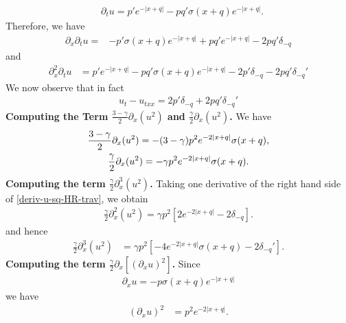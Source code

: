 \documentclass[12pt,reqno]{amsart}
\numberwithin{equation}{section}  %
\numberwithin{figure}{section}
\newcommand{\p}{\partial}
\theoremstyle{plain}  %
\theoremstyle{definition}
\begin{document}
%
\begin{align*}
  &\p_t u
  =
  p'e^{-|x+q|} 
  -
  pq'\sigma(x+q)e^{-|x+q|}.
\end{align*}
%
Therefore, we have 
%
\begin{align*}
  \p_x\p_t u
  = 
  &-p' \sigma(x+q) e^{-|x+q|}
  + 
  pq'e^{-|x+q|} 
  -
  2pq' \delta_{-q}
\end{align*}
%
and 
%
\begin{align*}
  \p_x^2\p_t u
  &=
  p'e^{-|x+q|}
  -
  pq'\sigma(x+q)e^{-|x+q|}
  -2p' \delta_{-q} - 2pq'\delta_{-q}' 
\end{align*}
%
We now observe that in fact
%
\begin{align}
  \label{deriv-t-term-trav-wav}
  u_t - u_{txx} = 2p' \delta_{-q} + 2pq'\delta_{-q}' 
\end{align}
%
{\bf Computing the Term $\displaystyle \frac{3-\gamma}{2} \p_x (u^{2})$ and $\displaystyle \frac{\gamma}{2} \p_x (u^{2})$.}
We have
%
%
%
%
\begin{gather}
  \notag \frac{3-\gamma}{2}\p_x (u^{2}) 
  = -(3-\gamma) p^{2}e^{-2| x+q |} \sigma(x+q),
  \\
  \label{deriv-u-sq-HR-trav}
  \frac{\gamma}{2}\p_x (u^{2}) 
  = -\gamma p^{2}e^{-2| x+q |} \sigma(x+q). 
\end{gather}
%
{\bf Computing the term $\displaystyle \frac{\gamma}{2} \p_x^3 (u^2)$.}
Taking one derivative of the right hand side of \eqref{deriv-u-sq-HR-trav}, we obtain 
%
\begin{equation*}
  \begin{split}
    \frac{\gamma}{2}\p_x^2 (u^{2})
    = \gamma p^{2}\left[ 2 e^{-2| x+q |} -2 \delta_{-q}  
    \right].
  \end{split}
\end{equation*}
%
and hence
\begin{equation}
  \label{deriv-trip-u-sq-HR-trav}
  \begin{split}
    \frac{\gamma}{2}\p_x^3 (u^{2})
    & = \gamma p^{2}\left[ -4 e^{-2| x+q |} \sigma(x+q) -2 \delta_{-q}'
    \right].  
  \end{split}
\end{equation}
%
{\bf Computing the term $\displaystyle \frac{\gamma}{2}\p_x [(\p_x u)^2]$.}
Since 
%
\begin{align*}
  \p_x u = -p\sigma(x+q) e^{-|x+q|} 
\end{align*}
%
we have
%
\begin{align*}
  (\p_x u)^2
  &= 
  p^2 e^{-2|x+q|}.
\end{align*}
\end{document}
